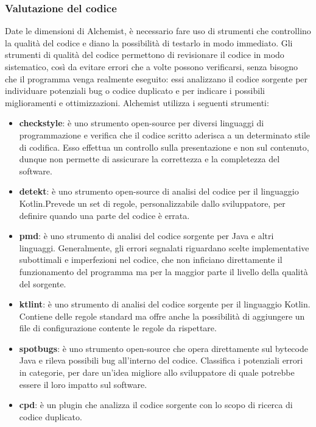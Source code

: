\documentclass[12pt,a4paper,openright,oneside]{book}
\begin{document}
\subsubsection{Valutazione del codice}
    Date le dimensioni di Alchemist, è necessario fare uso di strumenti che controllino la qualità del codice e diano la possibilità di testarlo in modo immediato. Gli strumenti di qualità del codice permettono di revisionare il codice in modo sistematico, così da evitare errori che a volte possono verificarsi, senza bisogno che il programma
    venga realmente eseguito: essi analizzano il codice sorgente per individuare potenziali bug
    o codice duplicato e per indicare i possibili miglioramenti e ottimizzazioni.
    Alchemist utilizza i seguenti strumenti:
    \begin{itemize}
        \item \textbf{checkstyle}: è uno strumento open-source per diversi linguaggi di programmazione e verifica che il codice scritto aderisca a un determinato stile di codifica. Esso effettua un controllo sulla presentazione e non sul contenuto, dunque non permette di assicurare la correttezza e la completezza del software.
        \item \textbf{detekt}: è uno strumento open-source di analisi del codice per il linguaggio Kotlin.Prevede un set di regole, personalizzabile dallo sviluppatore, per definire quando una parte del codice è errata.
        \item \textbf{pmd}: è uno strumento di analisi del codice sorgente per Java e altri linguaggi.
        Generalmente, gli errori segnalati riguardano scelte implementative subottimali e imperfezioni nel codice, che non inficiano direttamente il funzionamento del programma ma per la maggior parte il livello della qualità del sorgente.
        \item \textbf{ktlint}: è uno strumento di analisi del codice sorgente per il linguaggio Kotlin. Contiene delle regole standard ma offre anche la possibilità di aggiungere un file di configurazione contente le regole da rispettare.
        \item \textbf{spotbugs}: è uno strumento open-source che opera direttamente sul bytecode Java e rileva possibili bug all'interno del codice. Classifica i potenziali errori in categorie, per dare un’idea migliore allo sviluppatore di quale potrebbe essere il loro impatto sul software.
        \item \textbf{cpd}: è un plugin che analizza il codice sorgente con lo scopo di ricerca di codice duplicato.
    \end{itemize}
    
\end{document}
